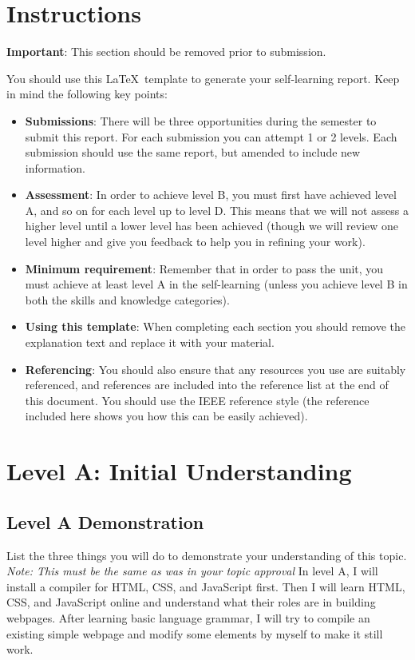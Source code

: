 \documentclass[a4paper, 11pt]{report}
\begin{document}
\tableofcontents


\newpage
\section*{Instructions}

\textbf{Important}: This section should be removed prior to submission.

You should use this \LaTeX\ template to generate your self-learning report. Keep in mind the following key points:
\begin{itemize}
	\item \textbf{Submissions}: There will be three opportunities during the semester to submit this report. For each submission you can attempt 1 or 2 levels. Each submission should use the same report, but amended to include new information.
	\item \textbf{Assessment}: In order to achieve level B, you must first have achieved level A, and so on for each level up to level D. This means that we will not assess a higher level until a lower level has been achieved (though we will review one level higher and give you feedback to help you in refining your work).
	\item \textbf{Minimum requirement}: Remember that in order to pass the unit, you must achieve at least level A in the self-learning (unless you achieve level B in both the skills and knowledge categories).
	\item \textbf{Using this template}: When completing each section you should remove the explanation text and replace it with your material.
	\item \textbf{Referencing}: You should also ensure that any resources you use are suitably referenced, and references are included into the reference list at the end of this document. You should use the IEEE reference style \cite{usyd2} (the reference included here shows you how this can be easily achieved).
\end{itemize}




\newpage
\section{Level A: Initial Understanding}
\vspace{5mm}
\subsection{Level A Demonstration}
List the three things you will do to demonstrate your understanding of this topic.
\textit{Note: This must be the same as was in your topic approval}
\newline
\newline
In level A, I will install a compiler for HTML, CSS, and JavaScript first. Then I will learn HTML, CSS, and JavaScript online and understand what their roles are in building webpages. After learning basic language grammar, I will try to compile an existing simple webpage and modify some elements by myself to make it still work.
\end{document}
